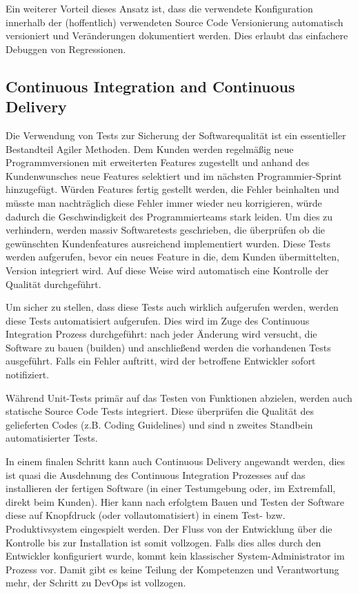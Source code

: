 Ein weiterer Vorteil dieses Ansatz ist, dass die verwendete Konfiguration innerhalb der (hoffentlich) verwendeten Source Code Versionierung automatisch versioniert und Veränderungen dokumentiert werden. Dies erlaubt das einfachere Debuggen von Regressionen.

\subsection{Continuous Integration and Continuous Delivery}

Die Verwendung von Tests zur Sicherung der Softwarequalität ist ein essentieller Bestandteil Agiler Methoden. Dem Kunden werden regelmäßig neue Programmversionen mit erweiterten Features zugestellt und anhand des Kundenwunsches neue Features selektiert und im nächsten Programmier-Sprint hinzugefügt. Würden Features fertig gestellt werden, die Fehler beinhalten und müsste man nachträglich diese Fehler immer wieder neu korrigieren, würde dadurch die Geschwindigkeit des Programmierteams stark leiden. Um dies zu verhindern, werden massiv Softwaretests geschrieben, die überprüfen ob die gewünschten Kundenfeatures ausreichend implementiert wurden. Diese Tests werden aufgerufen, bevor ein neues Feature in die, dem Kunden übermittelten, Version integriert wird. Auf diese Weise wird automatisch eine Kontrolle der Qualität durchgeführt.

Um sicher zu stellen, dass diese Tests auch wirklich aufgerufen werden, werden diese Tests automatisiert aufgerufen. Dies wird im Zuge des Continuous Integration Prozess durchgeführt: nach jeder Änderung wird versucht, die Software zu bauen (builden) und anschließend werden die vorhandenen Tests ausgeführt. Falls ein Fehler auftritt, wird der betroffene Entwickler sofort notifiziert.

Während Unit-Tests primär auf das Testen von Funktionen abzielen, werden auch statische Source Code Tests integriert. Diese überprüfen die Qualität des gelieferten Codes (z.B. Coding Guidelines) und sind n zweites Standbein automatisierter Tests.

In einem finalen Schritt kann auch Continuous Delivery angewandt werden, dies ist quasi die Ausdehnung des Continuous Integration Prozesses auf das installieren der fertigen Software (in einer Testumgebung oder, im Extremfall, direkt beim Kunden). Hier kann nach erfolgtem Bauen und Testen der Software diese auf Knopfdruck (oder vollautomatisiert) in einem Test- bzw. Produktivsystem eingespielt werden. Der Fluss von der Entwicklung über die Kontrolle bis zur Installation ist somit vollzogen. Falls dies alles durch den Entwickler konfiguriert wurde, kommt kein klassischer System-Administrator im Prozess vor. Damit gibt es keine Teilung der Kompetenzen und Verantwortung mehr, der Schritt zu DevOps ist vollzogen. 

